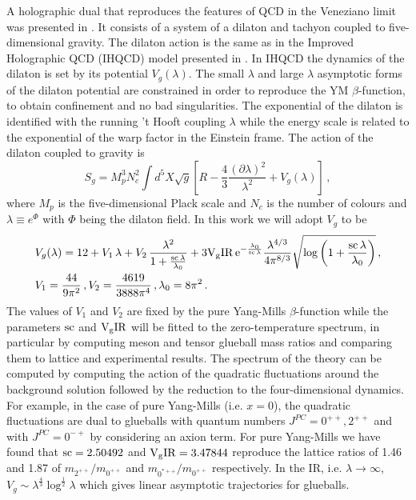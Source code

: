 \documentclass[a4paper,12pt]{article}
\begin{document}
A holographic dual that reproduces the features of QCD in the Veneziano limit was presented in \cite{Jarvinen:2011qe}. It consists of a system of a dilaton and tachyon coupled to five-dimensional gravity. The dilaton action is the same as in the Improved Holographic QCD (IHQCD) model presented in \cite{gursoy_exploring_2008, gursoy_exploring_2008-1}. In IHQCD the dynamics of the dilaton is set by its potential $V_g(\lambda)$. The small $\lambda$ and large $\lambda$ asymptotic forms of the dilaton potential are constrained in order to reproduce the YM $\beta$-function, to obtain confinement and no bad singularities. The exponential of the dilaton is identified with the running 't Hooft coupling $\lambda$ while the energy scale is related to the exponential of the warp factor in the Einstein frame.
The action of the dilaton coupled to gravity is
\begin{equation}
S_g =  M_p^3 N_c^2 \int d^5X \sqrt{g} \left[ R - \frac{4}{3} \frac{{\left( \partial \lambda \right)}^2}{\lambda^2}+ V_g \left( \lambda\right) \right]\, ,
\label{eq:sg_action}
\end{equation}
where $M_p$ is the five-dimensional Plack scale and $N_c$ is the number of colours and $\lambda \equiv e^{\Phi}$ with $\Phi$ being the dilaton field.
In this work we will adopt $V_g$ to be
\begin{align}
&V_g(\lambda) = 12 + V_1 \, \lambda + V_2 \, \frac{\lambda^2}{1 + \frac{\rm{sc} \, \lambda}{\lambda_0}} + 3 \rm{V_gIR} \, e^{-\frac{\lambda_0}{\rm {sc} \, \lambda}}  \frac{\lambda^{4/3}}{4 \pi^{8/3}}\sqrt{\log\left(1+\frac{\rm{sc} \, \lambda}{\lambda_0}\right)} \, , \\ \notag
& V_1 = \frac{44}{9 \pi^2} \, , V_2 = \frac{4619}{3888 \pi^4} \, , \lambda_0 = 8 \pi^2 \, .
\end{align}
The values of $V_1$ and $V_2$ are fixed by the pure Yang-Mills $\beta$-function while the parameters $\rm{sc}$ and $\rm{V_gIR}$ will be fitted to the zero-temperature spectrum, in particular by computing meson and tensor glueball mass ratios and comparing them to lattice and experimental results. The spectrum of the theory can be computed by computing the action of the quadratic fluctuations around the background solution followed by the reduction to the four-dimensional dynamics. For example, in the case of pure Yang-Mills (i.e. $x = 0$), the quadratic fluctuations are dual to glueballs with quantum numbers $J^{PC} = 0^{++}, 2^{++}$ and with $J^{PC} = 0^{-+}$ by considering an axion term. For pure Yang-Mills  we have found that $\rm{sc} = 2.50492$ and   $\rm{V_gIR} = 3.47844$ reproduce the lattice ratios of 1.46 and 1.87 of $m_{2^{++}} / m_{0^{++}}$ and $m_{0^{*++}} / m_{0^{++}}$ respectively. In the IR, i.e. $\lambda \rightarrow \infty$, $V_g \sim \lambda^{\frac{4}{3}} \log^{\frac{1}{2}} \lambda$ which gives  linear asymptotic trajectories for glueballs.
\end{document}
